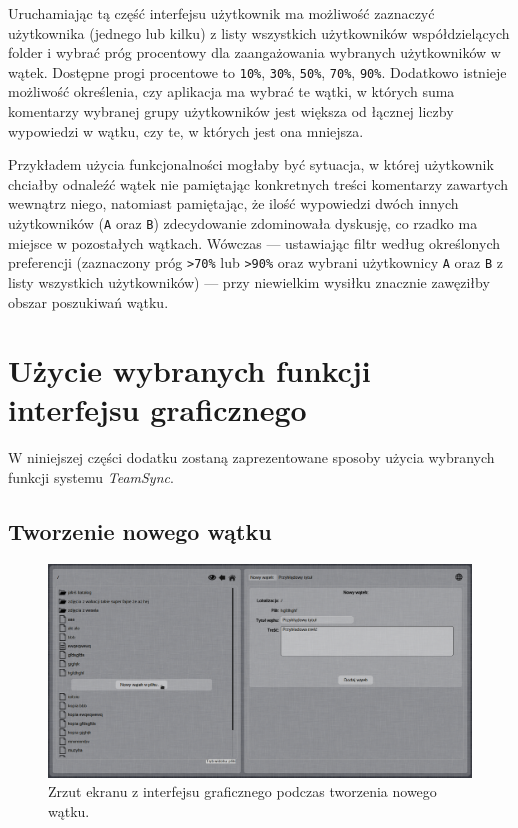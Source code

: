 Uruchamiając tą część interfejsu użytkownik ma możliwość zaznaczyć użytkownika (jednego lub kilku) z listy wszystkich użytkowników współdzielących folder i wybrać próg procentowy dla zaangażowania wybranych użytkowników w wątek. Dostępne progi procentowe to \texttt{10\%}, \texttt{30\%}, \texttt{50\%}, \texttt{70\%}, \texttt{90\%}. Dodatkowo istnieje możliwość określenia, czy aplikacja ma wybrać te wątki, w których suma komentarzy wybranej grupy użytkowników jest większa od łącznej liczby wypowiedzi w wątku, czy te, w których jest ona mniejsza.

Przykładem użycia funkcjonalności mogłaby być sytuacja, w której użytkownik chciałby odnaleźć wątek nie pamiętając konkretnych treści komentarzy zawartych wewnątrz niego, natomiast pamiętając, że ilość wypowiedzi dwóch innych użytkowników (\texttt{A} oraz \texttt{B}) zdecydowanie zdominowała dyskusję, co rzadko ma miejsce w pozostałych wątkach. Wówczas --- ustawiając filtr według określonych preferencji (zaznaczony próg \texttt{\textgreater 70\%} lub \texttt{\textgreater 90\%} oraz wybrani użytkownicy \texttt{A} oraz \texttt{B} z listy wszystkich użytkowników) --- przy niewielkim wysiłku znacznie zawęziłby obszar poszukiwań wątku.

\section{Użycie wybranych funkcji interfejsu graficznego}

W niniejszej części dodatku zostaną zaprezentowane sposoby użycia wybranych funkcji systemu \emph{TeamSync}.

\subsection*{Tworzenie nowego wątku}

\begin{figure}[h!]
  \vspace{5pt}
  \begin{center}
    \includegraphics[width=400pt]{figures/screenshotnewthread1.png}
  \end{center}
  \caption{Zrzut ekranu z interfejsu graficznego podczas tworzenia nowego wątku.}
\end{figure}

